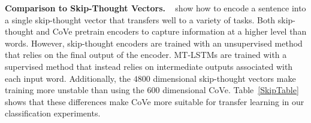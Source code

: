 \textbf{Comparison to Skip-Thought Vectors.}
~\citet{Kiros2015SkipThoughtV} show how to encode a sentence into a single skip-thought vector that transfers well to a variety of tasks.
Both skip-thought and CoVe pretrain encoders to capture information at a higher level than words. However, skip-thought encoders are trained with an unsupervised method that relies on the final output of the encoder. MT-LSTMs are trained with a supervised method that instead relies on intermediate outputs associated with each input word. Additionally, the $4800$ dimensional skip-thought vectors make training more unstable than using the $600$ dimensional CoVe. Table~\ref{SkipTable} shows that these differences make CoVe more suitable for transfer learning in our classification experiments.